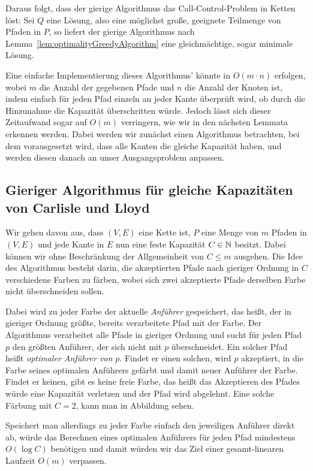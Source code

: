 Daraus folgt, dass der gierige Algorithmus das Call-Control-Problem in Ketten löst:
Sei $Q$ eine Lösung, also eine möglichst große, geeignete Teilmenge von Pfaden in $P$, so liefert der gierige
Algorithmus nach Lemma~\ref{lem:optimalityGreedyAlgorithm} eine gleichmächtige, sogar minimale Lösung.

Eine einfache Implementierung dieses Algorithmus' könnte in $O(m \cdot n)$ erfolgen, wobei $m$ die Anzahl der gegebenen
Pfade und $n$ die Anzahl der Knoten ist, indem einfach für jeden Pfad einzeln an jeder Kante überprüft wird, ob durch
die Hinzunahme die Kapazität überschritten würde.
Jedoch lässt sich dieser Zeitaufwand sogar auf $O(m)$ verringern, wie wir in den nächsten Lemmata 
erkennen werden.
Dabei werden wir zunächst einen Algorithmus betrachten, bei dem vorausgesetzt wird, dass alle Kanten die gleiche
Kapazität haben, und werden diesen danach an unser Ausgangsproblem anpassen.

\subsection{Gieriger Algorithmus für gleiche Kapazitäten von Carlisle und Lloyd}\label{subsec:algorithmusGleicheKapazitäten}
Wir gehen davon aus, dass $(V,E)$ eine Kette ist, $P$ eine Menge von $m$ Pfaden in $(V,E)$ und jede Kante in $E$ nun eine
feste Kapazität $C \in \mathbb N$ besitzt.
Dabei können wir ohne Beschränkung der Allgemeinheit von $C \leq m$ ausgehen.
Die Idee des Algorithmus besteht darin, die akzeptierten Pfade nach gieriger Ordnung in $C$ verschiedene Farben zu
färben, wobei sich zwei akzeptierte Pfade derselben Farbe nicht überschneiden sollen.

Dabei wird zu jeder Farbe der aktuelle {\em Anführer} gespeichert, das heißt, der in gieriger Ordnung größte, bereits
verarbeitete Pfad mit der Farbe.
Der Algorithmus verarbeitet alle Pfade in gieriger Ordnung und sucht für jeden Pfad $p$ den größten Anführer, der
sich nicht mit $p$ überschneidet.
Ein solcher Pfad heißt {\em optimaler Anführer von $p$}.
Findet er einen solchen, wird $p$ akzeptiert, in die Farbe seines optimalen Anführers gefärbt und damit neuer Anführer
der Farbe.
Findet er keinen, gibt es keine freie Farbe, das heißt das Akzeptieren des Pfades würde eine Kapazität verletzen und der
Pfad wird abgelehnt.
Eine solche Färbung mit $C = 2$, kann man in Abbildung  sehen.


Speichert man allerdings zu jeder Farbe einfach den jeweiligen Anführer direkt ab, würde das Berechnen eines optimalen
Anführers für jeden Pfad mindestens $O(\log C)$ benötigen und damit würden wir das Ziel einer gesamt-linearen Laufzeit
$O(m)$ verpassen.

